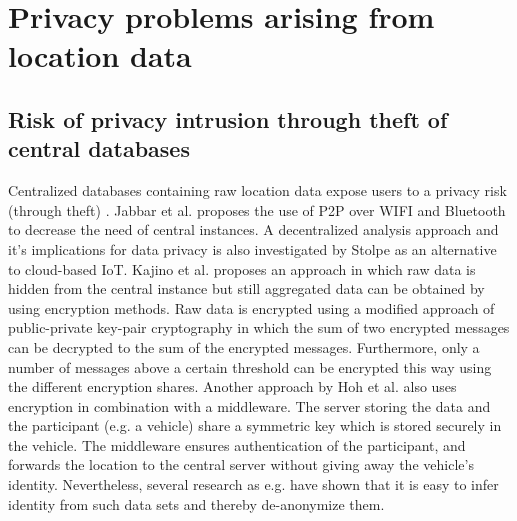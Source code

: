 \section{Privacy problems arising from location data}
\subsection{Risk of privacy intrusion through theft of central databases}
Centralized databases containing raw location data expose users to a privacy risk (through theft) \parencite{iot, hoh2006enhancing}. Jabbar et al. \parencite{p2p-android} proposes the use of P2P over WIFI and Bluetooth to decrease the need of central instances. A decentralized analysis approach and it's implications for data privacy is also investigated by Stolpe \parencite{iot} as an alternative to cloud-based IoT.
Kajino et al. \parencite{crowdsourcing} proposes an approach in which raw data is hidden from the central instance but still aggregated data can be obtained by using encryption methods. Raw data is encrypted using a modified approach of public-private key-pair cryptography in which the sum of two encrypted messages can be decrypted to the sum of the encrypted messages. Furthermore, only a number of messages above a certain threshold can be encrypted this way using the different encryption shares. 
Another approach by Hoh et al. \parencite{hoh2006enhancing} also uses encryption in combination with a middleware. The server storing the data and the participant (e.g. a vehicle) share a symmetric key which is stored securely in the vehicle. The middleware ensures authentication of the participant, and forwards the location to the central server without giving away the vehicle's identity. Nevertheless, several research as e.g. \parencite{krumm, twitter, cellphone} have shown that it is easy to infer identity from such data sets and thereby de-anonymize them. 

